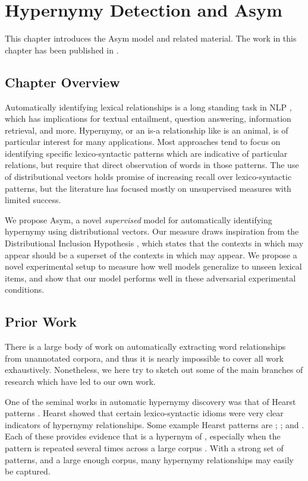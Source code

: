 \chapter{Hypernymy Detection and Asym}\label{ch:lexmem}

This chapter introduces the Asym model and related material. The work
in this chapter has been published in .

\section{Chapter Overview}

Automatically identifying lexical relationships is a long standing task
in NLP \cite{hearst:1992:coling,snow:2004:nips,girju:2006:cl}, which has
implications for textual entailment, question answering, information
retrieval, and more. Hypernymy, or an is-a relationship like  is an
animal, is of particular interest for many applications. Most approaches tend
to focus on identifying specific lexico-syntactic patterns which are indicative
of particular relations, but require that direct observation of words in
those patterns. The use of distributional vectors holds promise of increasing
recall over lexico-syntactic patterns, but the literature has focused mostly
on unsupervised measures with limited success.

We propose Asym, a novel {\em supervised} model for automatically identifying
hypernymy using distributional vectors. Our measure draws inspiration from
the Distributional Inclusion Hypothesis \cite{zhitomirskygeffet:2005:acl},
which states that the contexts in which  may appear should be a
superset of the contexts in which  may appear. We propose a novel
experimental setup to measure how well models generalize to unseen lexical
items, and show that our model performs well in these adversarial experimental
conditions.

\section{Prior Work}

There is a large body of work on automatically extracting word relationships
from unannotated corpora, and thus it is nearly impossible to cover all work
exhaustively. Nonetheless, we here try to sketch out some of the main branches
of research which have led to our own work.

One of the seminal works in automatic hypernymy discovery was that of Hearst
patterns \cite{hearst:1992:coling}. Hearst showed that certain lexico-syntactic
idioms were very clear indicators of hypernymy relationships. Some example
Hearst patterns are ; ;
and . Each of these provides evidence that  is a
hypernym of , especially when the pattern is repeated several times across a
large corpus \cite{hearst:1992:coling}. With a strong set of patterns, and a
large enough corpus, many hypernymy relationships may easily be captured.

